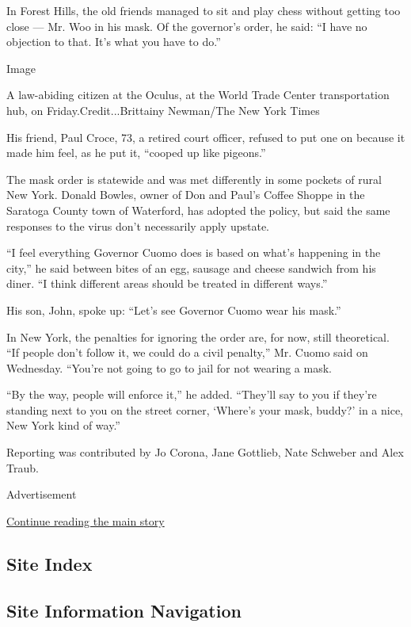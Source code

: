 In Forest Hills, the old friends managed to sit and play chess without
getting too close --- Mr. Woo in his mask. Of the governor's order, he
said: ``I have no objection to that. It's what you have to do.''

Image

A law-abiding citizen at the Oculus, at the World Trade Center
transportation hub, on Friday.Credit...Brittainy Newman/The New York
Times

His friend, Paul Croce, 73, a retired court officer, refused to put one
on because it made him feel, as he put it, ``cooped up like pigeons.''

The mask order is statewide and was met differently in some pockets of
rural New York. Donald Bowles, owner of Don and Paul's Coffee Shoppe in
the Saratoga County town of Waterford, has adopted the policy, but said
the same responses to the virus don't necessarily apply upstate.

``I feel everything Governor Cuomo does is based on what's happening in
the city,'' he said between bites of an egg, sausage and cheese sandwich
from his diner. ``I think different areas should be treated in different
ways.''

His son, John, spoke up: ``Let's see Governor Cuomo wear his mask.''

In New York, the penalties for ignoring the order are, for now, still
theoretical. ``If people don't follow it, we could do a civil penalty,''
Mr. Cuomo said on Wednesday. ``You're not going to go to jail for not
wearing a mask.

``By the way, people will enforce it,'' he added. ``They'll say to you
if they're standing next to you on the street corner, `Where's your
mask, buddy?' in a nice, New York kind of way.''

Reporting was contributed by Jo Corona, Jane Gottlieb, Nate Schweber and
Alex Traub.

Advertisement

\protect\hyperlink{after-bottom}{Continue reading the main story}

\hypertarget{site-index}{%
\subsection{Site Index}\label{site-index}}

\hypertarget{site-information-navigation}{%
\subsection{Site Information
Navigation}\label{site-information-navigation}}

